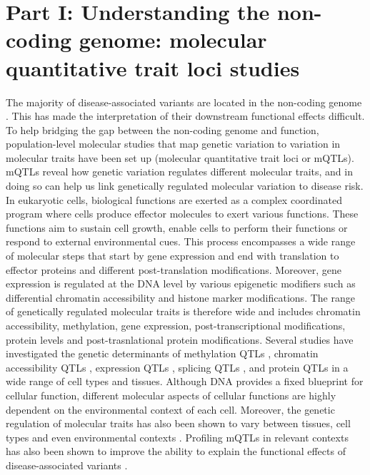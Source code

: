 

\section{Part I: Understanding the non-coding genome: molecular quantitative trait loci studies}
The majority of disease-associated variants are located in the non-coding genome \cite{Hindorff2009-te}. This has made the interpretation of their downstream functional effects difficult. To help bridging the gap between the non-coding genome and function, population-level molecular studies that map genetic variation to variation in molecular traits have been set up (molecular quantitative trait loci or mQTLs). mQTLs reveal how genetic variation regulates different molecular traits, and in doing so can help us link genetically regulated molecular variation to disease risk.\\ 

In eukaryotic cells, biological functions are exerted as a complex coordinated program where cells produce effector molecules to exert various functions. These functions aim to sustain cell growth, enable cells to perform their functions or respond to external environmental cues. This process encompasses a wide range of molecular steps that start by gene expression and end with translation to effector proteins and different post-translation modifications. Moreover, gene expression is regulated at the DNA level by various epigenetic modifiers such as differential chromatin accessibility and histone marker modifications. The range of genetically regulated molecular traits is therefore wide and includes chromatin accessibility, methylation, gene expression, post-transcriptional modifications, protein levels and post-trasnlational protein modifications. Several studies have investigated the genetic determinants of methylation QTLs \cite{Oliva2023-nt,Hannon2016-mt,Morrow2018-fv,Taylor2019-tm,Huan2019-ke,Andrews2017-os}, chromatin accessibility QTLs \cite{Alasoo2018-pv,Currin2021-kp}, expression QTLs \cite{The_GTEx_Consortium2020-gg,Vosa2021-pb,Kerimov2021-gh}, splicing QTLs \cite{The_GTEx_Consortium2020-gg,Qi2022-iz}, and protein QTLs \cite{Yao2018-oy,Sun2018-uy} in a wide range of cell types and tissues. Although DNA provides a fixed blueprint for cellular function, different molecular aspects of cellular functions are highly dependent on the environmental context of each cell. Moreover, the genetic regulation of molecular traits has also been shown to vary between tissues, cell types and even environmental contexts \cite{Zhernakova2017-uo,Mu2021-ar}. Profiling mQTLs in relevant contexts has also been shown to improve the ability to explain the functional effects of disease-associated variants \cite{Ongen2017-cd}.\\

